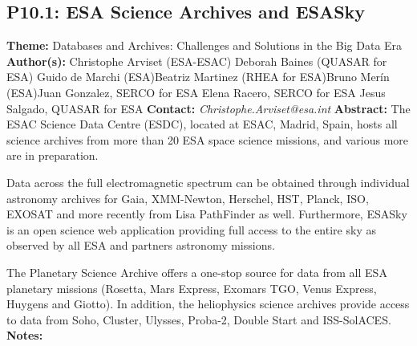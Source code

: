 \documentclass{report}
\begin{document}
{{{{{{{{{{\subsection*{P10.1: ESA Science Archives and ESASky}
{\bf Theme:}  Databases and Archives: Challenges and Solutions in the Big Data Era\newline
{\bf Author(s):}\newline
Christophe Arviset (ESA-ESAC) \newline Deborah Baines (QUASAR for ESA) \newline  Guido de Marchi (ESA)\newline  Beatriz Martinez (RHEA for ESA)\newline Bruno Merín (ESA)\newline  Juan Gonzalez, SERCO for ESA
Elena Racero, SERCO for ESA
Jesus Salgado, QUASAR for ESA\newline\newline
{\bf Contact:} {\it Christophe.Arviset@esa.int}\newline
\newline\newline
{\bf Abstract:}\newline
The ESAC Science Data Centre (ESDC), located at ESAC, Madrid, Spain, hosts all science archives from more than 20 ESA space science missions, and various more are in preparation. 

Data across the full electromagnetic spectrum can be obtained through individual astronomy archives for Gaia, XMM-Newton, Herschel, HST, Planck, ISO, EXOSAT and more recently from Lisa PathFinder as well. Furthermore, ESASky is an open science web application providing full access to the entire sky as observed by all ESA and partners astronomy missions.

The Planetary Science Archive offers a one-stop source for data from all ESA planetary missions (Rosetta, Mars Express, Exomars TGO, Venus Express, Huygens and Giotto). In addition, the heliophysics science archives provide access to data from Soho, Cluster, Ulysses, Proba-2, Double Start and ISS-SolACES.\newline
{\bf Notes:}\newline
{\newpage
}}}}}}}}}}}
\end{document}
